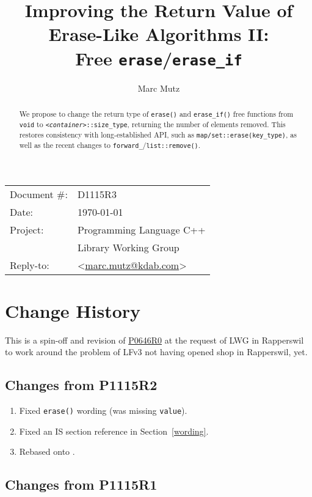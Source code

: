 \documentclass[11pt]{article}
\date{}
\title{Improving the Return Value of Erase-Like Algorithms II:\\ Free
  \texttt{erase}/\texttt{erase\_if}}
\makeatletter
\newcommand{\emailaddress}{marc.mutz@kdab.com}
\newcommand{\email}{\href{mailto:\emailaddress}{\emailaddress}}
\newcommand{\wgpaper}[1]{\href{https://wg21.link/#1}{#1}}
\newcommand{\cst}{\texttt{\textit{<container>}::size\_type}}
\makeatother
\begin{document}
\maketitle\vspace{-2cm}

\begin{tabular}{ll}
  Document \#:&D1115R3\\
  Date:       &\today\\
  Project:    &Programming Language C++\\
              &Library Working Group\\
  Reply-to:   &\author{Marc Mutz} \textless\email\textgreater
\end{tabular}
\vspace{1cm}
\begin{abstract}
  We propose to change the return type of \texttt{erase()} and
  \texttt{erase\_if()} free functions from \texttt{void} to \cst,
  returning the number of elements removed. This restores consistency
  with long-established API, such as
  \texttt{map/set::erase(key\_type)}, as well as the recent changes to
  \texttt{forward\_}/\texttt{list::remove()}.
\end{abstract}


\tableofcontents

\section{Change History}

This is a spin-off and revision of \wgpaper{P0646R0} at the request of
LWG in Rapperswil to work around the problem of LFv3 not having opened
shop in Rapperswil, yet.

\subsection{Changes from P1115R2}

\begin{enumerate}
\item Fixed \texttt{erase()} wording (was missing \texttt{value}).
\item Fixed an IS section reference in Section~\ref{wording}.
\item Rebased onto \cite{N4835}.
\end{enumerate}

\subsection{Changes from P1115R1}
\end{document}
